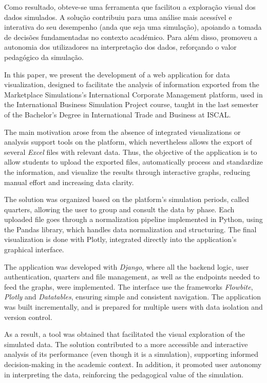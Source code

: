Como resultado, obteve-se uma ferramenta que facilitou a exploração visual dos dados simulados. A solução contribuiu para uma análise mais acessível e interativa do seu desempenho (anda que seja uma simulação), apoiando a tomada de decisões fundamentadas no contexto académico. Para além disso, promoveu a autonomia dos utilizadores na interpretação dos dados, reforçando o valor pedagógico da simulação.


In this paper, we present the development of a web application for data visualization, designed to facilitate the analysis of information exported from the Marketplace Simulations's International Corporate Management platform, used in the International Business Simulation Project course, taught in the last semester of the Bachelor's Degree in International Trade and Business at ISCAL.

The main motivation arose from the absence of integrated visualizations or analysis support tools on the platform, which nevertheless allows the export of several \textit{Excel} files with relevant data. Thus, the objective of the application is to allow students to upload the exported files, automatically process and standardize the information, and visualize the results through interactive graphs, reducing manual effort and increasing data clarity.

The solution was organized based on the platform's simulation periods, called quarters, allowing the user to group and consult the data by phase. Each uploaded file goes through a normalization pipeline implemented in Python, using the Pandas library, which handles data normalization and structuring. The final visualization is done with Plotly, integrated directly into the application's graphical interface.

The application was developed with \textit{Django}, where all the backend logic, user authentication, quarters and file management, as well as the endpoints needed to feed the graphs, were implemented. The interface use the frameworks \textit{Flowbite}, \textit{Plotly} and \textit{Datatables}, ensuring simple and consistent navigation. The application was built incrementally, and is prepared for multiple users with data isolation and version control.

As a result, a tool was obtained that facilitated the visual exploration of the simulated data. The solution contributed to a more accessible and interactive analysis of its performance (even though it is a simulation), supporting informed decision-making in the academic context. In addition, it promoted user autonomy in interpreting the data, reinforcing the pedagogical value of the simulation.
